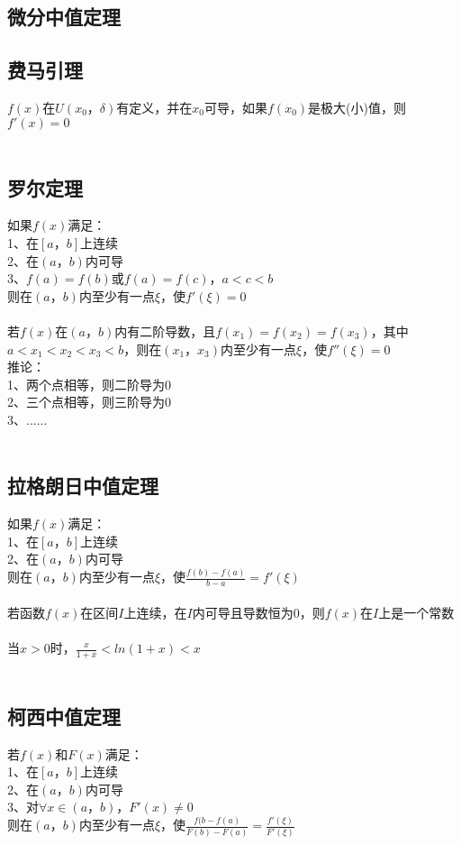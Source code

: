 \documentclass{article}
\begin{document}
\begin{flushleft}
	\LARGE
	
	\section{微分中值定理}
	
	\subsection{费马引理}
	$f(x)$在$U(x_0，\delta)$有定义，并在$x_0$可导，如果$f(x_0)$是极大(小)值，则$f'(x)=0$\\
	~\\
	\subsection{罗尔定理}
	如果$f(x)$满足：\\
	1、在$[a，b]$上连续\\
	2、在$(a，b)$内可导\\
	3、$f(a)=f(b)$或$f(a)=f(c)， a<c<b$\\
	则在$(a，b)$内至少有一点$\xi$，使$f'(\xi)=0$\\
	~\\
	若$f(x)$在$(a，b)$内有二阶导数，且$f(x_1)=f(x_2)=f(x_3)$，其中$a<x_1<x_2<x_3<b$，则在$(x_1，x_3)$内至少有一点$\xi$，使$f''(\xi)=0$\\
	推论：\\
	1、两个点相等，则二阶导为0\\
	2、三个点相等，则三阶导为0\\
	3、......\\
	~\\
	\subsection{拉格朗日中值定理}
	如果$f(x)$满足：\\
	1、在$[a，b]$上连续\\
	2、在$(a，b)$内可导\\
	则在$(a，b)$内至少有一点$\xi$，使$\frac{f(b)-f(a)}{b-a}=f'(\xi)$\\
	~\\
	若函数$f(x)$在区间$I$上连续，在$I$内可导且导数恒为0，则$f(x)$在$I$上是一个常数\\
	~\\
	当$x>0$时，$\frac{x}{1+x}<ln(1+x)<x$\\
	~\\
	\subsection{柯西中值定理}
	若$f(x)$和$F(x)$满足：\\
	1、在$[a，b]$上连续\\
	2、在$(a，b)$内可导\\
	3、对$\forall x\in (a，b)，F'(x)\neq 0$\\
	则在$(a，b)$内至少有一点$\xi$，使$\frac{f(b-f(a)}{F(b)-F(a)}=\frac{f'(\xi)}{F'(\xi)}$\\
	

\end{flushleft}
\end{document}
